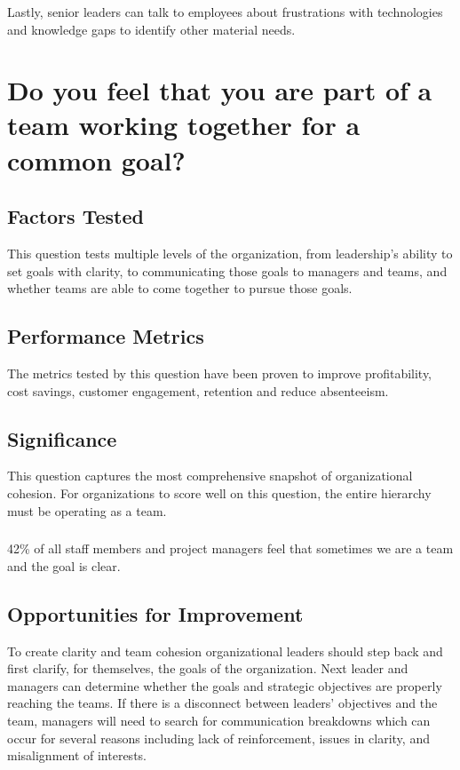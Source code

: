 \documentclass[14pt]{extreport}
\begin{document}
\subsubsection*{}
Lastly, senior leaders can talk to employees about frustrations with technologies and knowledge gaps to identify other material needs.


\newpage
\section*{Do you feel that you are part of a team working together for a common goal?}

\subsection*{\centering Factors Tested}
This question tests multiple levels of the organization, from
leadership's ability to set goals with clarity, to communicating
those goals to managers and teams, and whether teams are able to
come together to pursue those goals.
\subsection*{\centering Performance Metrics}
The metrics tested by this question have been proven to improve
profitability, cost savings, customer engagement, retention
and reduce absenteeism.

\subsection*{\centering Significance}
This question captures the most comprehensive snapshot of organizational cohesion. For organizations to score well on this question, the entire hierarchy must be operating as a team.
\subsubsection*{}
42\% of all staff members and project managers feel that sometimes we are a
team and the goal is clear.

\subsection*{\centering Opportunities for Improvement}
To create clarity and team cohesion organizational leaders should step back and first clarify, for themselves, the goals of the organization. Next leader and managers can determine whether the goals and strategic objectives are properly reaching the teams. If there is a disconnect between leaders' objectives and the team, managers will need to search for communication breakdowns which can occur for several reasons including lack of reinforcement, issues in clarity, and misalignment of interests.
\end{document}
